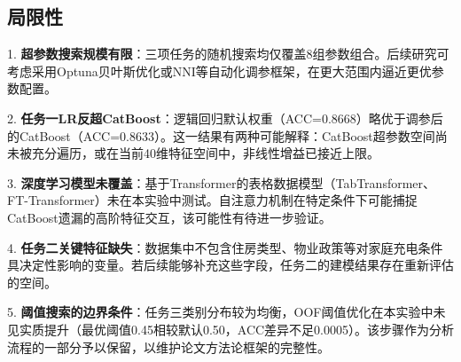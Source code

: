 \subsection{局限性}

1. \textbf{超参数搜索规模有限}：三项任务的随机搜索均仅覆盖8组参数组合。后续研究可考虑采用Optuna贝叶斯优化或NNI等自动化调参框架，在更大范围内逼近更优参数配置。

2. \textbf{任务一LR反超CatBoost}：逻辑回归默认权重（ACC=0.8668）略优于调参后的CatBoost（ACC=0.8633）。这一结果有两种可能解释：CatBoost超参数空间尚未被充分遍历，或在当前40维特征空间中，非线性增益已接近上限。

3. \textbf{深度学习模型未覆盖}：基于Transformer的表格数据模型（TabTransformer、FT-Transformer）未在本实验中测试。自注意力机制在特定条件下可能捕捉CatBoost遗漏的高阶特征交互，该可能性有待进一步验证。

4. \textbf{任务二关键特征缺失}：数据集中不包含住房类型、物业政策等对家庭充电条件具决定性影响的变量。若后续能够补充这些字段，任务二的建模结果存在重新评估的空间。

5. \textbf{阈值搜索的边界条件}：任务三类别分布较为均衡，OOF阈值优化在本实验中未见实质提升（最优阈值0.45相较默认0.50，ACC差异不足0.0005）。该步骤作为分析流程的一部分予以保留，以维护论文方法论框架的完整性。
